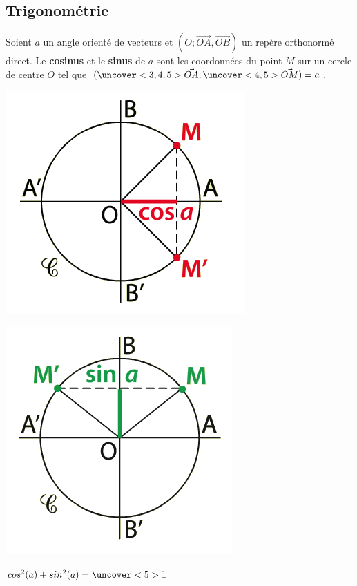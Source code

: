 \documentclass{beamer}
\theoremstyle{plain}
\begin{document}
 \subsection{Trigonométrie}
 \begin{frame}
 
 
 \begin{definition}
 Soient $a$ un angle orienté de vecteurs et $(O;\vec{OA},\vec{OB})$ un repère orthonormé direct. 
 Le \textbf{cosinus} et le \textbf{sinus} de $a$ sont les coordonnées du point $M$ sur un cercle 
  de centre $O$
 tel que $(\uncover<3,4,5>{\vec{OA}},\uncover<4,5>{\vec{OM}})=a$.
  \begin{multicols}{2}
  
  
  \begin{center}
    \includegraphics[scale=0.5]{../Images/cosinus.png}
  \end{center}
  
  \columnbreak 
  
  
  \begin{center}
    \includegraphics[scale=0.5]{../Images/sinus.png}
  \end{center}

  \end{multicols}
    \begin{center}
   $cos^2(a)+sin^2(a)=\uncover<5>{1}$
  \end{center}
  
 \end{definition}
 \end{frame}
 
\end{document}
